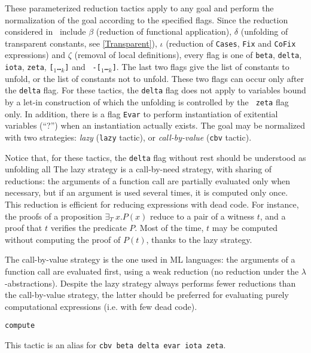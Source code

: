 These parameterized reduction tactics apply to any goal and perform
the normalization of the goal according to the specified flags. Since
the reduction considered in \Coq\ include $\beta$ (reduction of
functional application), $\delta$ (unfolding of transparent constants,
see \ref{Transparent}), $\iota$ (reduction of {\tt Cases}, {\tt Fix}
and {\tt CoFix} expressions) and $\zeta$ (removal of local
definitions), every flag is one of {\tt beta}, {\tt delta}, {\tt
  iota}, {\tt zeta}, {\tt [\qualid$_1$\ldots\qualid$_k$]} and {\tt
  -[\qualid$_1$\ldots\qualid$_k$]}.  The last two flags give the list
of constants to unfold, or the list of constants not to unfold. These
two flags can occur only after the {\tt delta} flag.  For these
tactics, the {\tt delta} flag does not apply to variables bound by a
let-in construction of which the unfolding is controlled by the {\tt
  zeta} flag only.  In addition, there is a flag {\tt Evar} to perform
instantiation of exitential variables (``?'') when an instantiation
actually exists.  The goal may be normalized with two strategies: {\em
  lazy} ({\tt lazy} tactic), or {\em call-by-value} ({\tt cbv}
tactic).

Notice that, for these tactics, the {\tt delta} flag without rest
should be understood as unfolding all The lazy strategy is a
call-by-need strategy, with sharing of reductions: the arguments of a
function call are partially evaluated only when necessary, but if an
argument is used several times, it is computed only once. This
reduction is efficient for reducing expressions with dead code. For
instance, the proofs of a proposition $\exists_T ~x. P(x)$ reduce to a
pair of a witness $t$, and a proof that $t$ verifies the predicate
$P$. Most of the time, $t$ may be computed without computing the proof
of $P(t)$, thanks to the lazy strategy.

The call-by-value strategy is the one used in ML languages: the
arguments of a function call are evaluated first, using a weak
reduction (no reduction under the $\lambda$-abstractions). Despite the
lazy strategy always performs fewer reductions than the call-by-value
strategy, the latter should be preferred for evaluating purely
computational expressions (i.e. with few dead code).

\begin{Variants}
\item {\tt compute}  
  
  This tactic is an alias for {\tt cbv beta delta evar iota zeta}.
\end{Variants}

